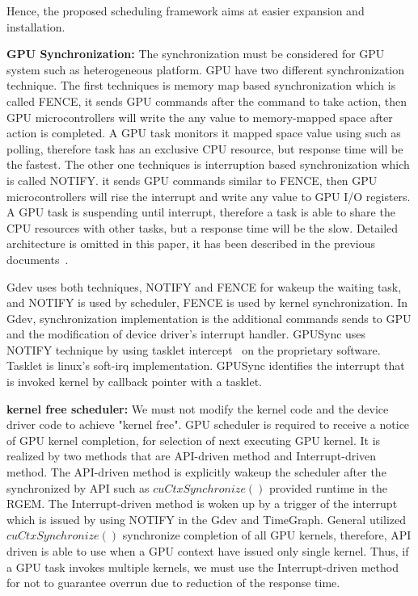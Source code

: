 Hence, the proposed scheduling framework aims at easier expansion and installation.

\textbf{GPU Synchronization:}
The synchronization must be considered for GPU system such as heterogeneous platform.
GPU have two different synchronization technique.
The first techniques is memory map based synchronization which is called FENCE,
it sends GPU commands after the command to take action,
then GPU microcontrollers will write the any value to memory-mapped space after action is completed.
A GPU task monitors it mapped space value using such as polling,
therefore task has an exclusive CPU resource,
but response time will be the fastest.
The other one techniques is interruption based synchronization which is called NOTIFY.
it sends GPU commands similar to FENCE,
then GPU microcontrollers will rise the interrupt and write any value to GPU I/O registers.
A GPU task is suspending until interrupt,
therefore a task is able to share the CPU resources with other tasks,
but a response time will be the slow.
Detailed architecture is omitted in this paper,
it has been described in the previous documents~\cite{kato:timegraph, kato:gdev, fujii:apsys2013}.

Gdev uses both techniques, NOTIFY and FENCE for wakeup the waiting task, 
and NOTIFY is used by scheduler, FENCE is used by kernel synchronization. 
In Gdev, synchronization implementation is the additional commands sends to GPU and the modification of device driver’s interrupt handler.
GPUSync uses NOTIFY technique by using tasklet intercept~\cite{elliott2012robust} on the proprietary software.
Tasklet is linux’s soft-irq implementation.
GPUSync identifies the interrupt that is invoked kernel by callback pointer with a tasklet.

\textbf{kernel free scheduler:}
We must not modify the kernel code and the device driver code to achieve "kernel free".
GPU scheduler is required to receive a notice of GPU kernel completion, for selection of next executing GPU kernel.
It is realized by two methods that are API-driven method and Interrupt-driven method.
The API-driven method is explicitly wakeup the scheduler after the synchronized by API such as $cuCtxSynchronize()$ provided runtime in the RGEM.
The Interrupt-driven method is woken up by a trigger of the interrupt which is issued by using NOTIFY in the Gdev and TimeGraph.
General utilized $cuCtxSynchronize()$ synchronize completion of all GPU kernels, therefore, API driven is able to use when a GPU context have issued only single kernel.
Thus, if a GPU task invokes multiple kernels, we must use the Interrupt-driven method for not to guarantee overrun due to reduction of the response time.

